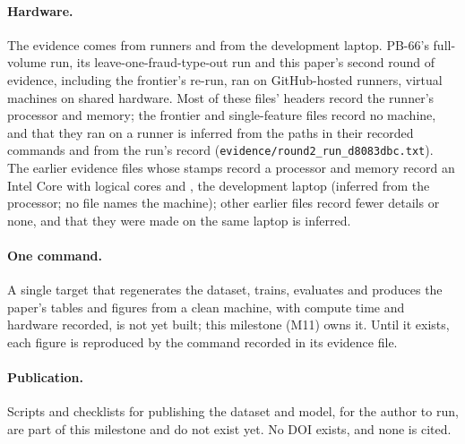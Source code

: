\paragraph{Hardware.} The evidence comes from runners and from the development laptop. PB-66's full-volume run, its
leave-one-fraud-type-out run and this paper's second round of evidence, including the frontier's
re-run, ran on GitHub-hosted runners, virtual machines on shared hardware. Most of these files' headers
record the runner's processor and memory; the frontier and single-feature files record no machine,
and that they ran on a runner is inferred from the paths in their recorded commands and from the
run's record (\texttt{evidence/\allowbreak round2\_\allowbreak run\_\allowbreak d8083dbc.txt}). The earlier evidence files whose stamps record a processor and memory
record an Intel Core \nHwCPU{} with \nHwCores{} logical cores and \nHwMem{}, the development laptop
(inferred from the processor; no file names the machine); other earlier files record fewer details or none, and that they were made on the same laptop is inferred.

\paragraph{One command.} A single target that regenerates the dataset, trains, evaluates and
produces the paper's tables and figures from a clean machine, with compute time and hardware
recorded, is not yet built; this milestone (M11) owns it. Until it exists, each figure is reproduced by the command recorded in its
evidence file.

\paragraph{Publication.} Scripts and checklists for publishing the dataset and model, for the author
to run, are part of this milestone and do not exist yet. No DOI exists, and none is cited.
